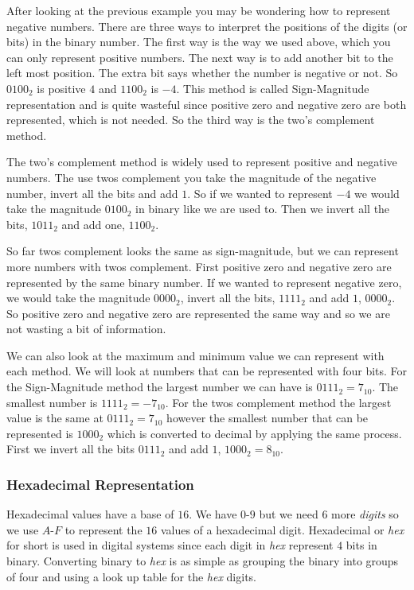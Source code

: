 After looking at the previous example you may be wondering how to represent negative numbers. There are three ways to interpret the positions of the digits (or bits) in the binary number. The first way is the way we used above, which you can only represent positive numbers. The next way is to add another bit to the left most position. The extra bit says whether the number is negative or not. So $0100_2$ is positive $4$ and $1100_2$ is $-4$. This method is called Sign-Magnitude representation and is quite wasteful since positive zero and negative zero are both represented, which is not needed. So the third way is the two's complement method.	
	
The two's complement method is widely used to represent positive and negative numbers. The use twos complement you take the magnitude of the negative number, invert all the bits and add $1$. So if we wanted to represent $-4$ we would take the magnitude $0100_2$ in binary like we are used to. Then we invert all the bits, $1011_2$ and add one, $1100_2$.	
	
So far twos complement looks the same as sign-magnitude, but we can represent more numbers with twos complement. First positive zero and negative zero are represented by the same binary number. If we wanted to represent negative zero, we would take the magnitude $0000_2$, invert all the bits, $1111_2$ and add $1$, $0000_2$. So positive zero and negative zero are represented the same way and so we are not wasting a bit of information.
	
We can also look at the maximum and minimum value we can represent with each method. We will look at numbers that can be represented with four bits. For the Sign-Magnitude method the largest number we can have is $0111_2 = 7_{10}$. The smallest number is $1111_2 = -7_{10}$. For the twos complement method the largest value is the same at $0111_2 = 7_{10}$ however the smallest number that can be represented is $1000_2$ which is converted to decimal by applying the same process. First we invert all the bits $0111_2$ and add $1$, $1000_2 = 8_{10}$.
	
\subsubsection{Hexadecimal Representation}
Hexadecimal values have a base of $16$. We have $0$-$9$ but we need $6$ more \emph{digits} so we use $A$-$F$ to represent the $16$ values of a hexadecimal digit. Hexadecimal or \emph{hex} for short is used in digital systems since each digit in \emph{hex} represent $4$ bits in binary. Converting binary to \emph{hex} is as simple as grouping the binary into groups of four and using a look up table for the \emph{hex} digits.
	
